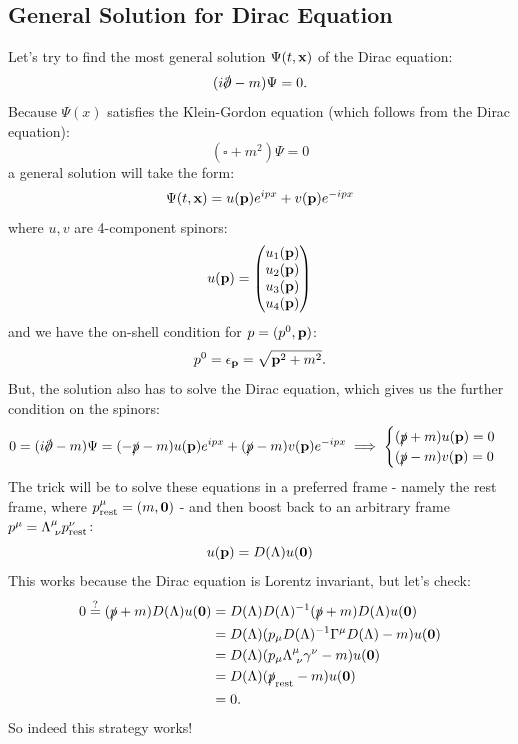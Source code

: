 \subsection{General Solution for Dirac Equation}
Let's try to find the most general solution $\Psi(t, \mathbf{x})$ of the Dirac equation:
\begin{equation}
    (i\slashed{\p} - m)\Psi = 0.
\end{equation}
Because $\Psi(x)$ satisfies the Klein-Gordon equation (which follows from the Dirac equation):
\begin{equation}
    (\square + m^2)\Psi = 0
\end{equation}
a general solution will take the form:
\begin{equation}
    \Psi(t, \mathbf{x}) = u(\mathbf{p})e^{ipx} + v(\mathbf{p})e^{-ipx}
\end{equation}
where $u, v$ are 4-component spinors:
\begin{equation}
    u(\mathbf{p}) = \begin{pmatrix}u_1(\mathbf{p}) \\ u_2(\mathbf{p}) \\ u_3(\mathbf{p}) \\ u_4(\mathbf{p})\end{pmatrix}
\end{equation}
and we have the on-shell condition for $p = (p^0, \mathbf{p})$:
\begin{equation}
    p^0 = \epsilon_{\mathbf{p}} = \sqrt{\mathbf{p}^2 + m^2}.
\end{equation}
But, the solution also has to solve the Dirac equation, which gives us the further condition on the spinors:
\begin{equation}
    0 = (i\slashed{\p} - m)\Psi = (-\slashed{p} - m)u(\v{p})e^{ipx} + (\slashed{p} - m)v(\v{p})e^{-ipx} \implies \begin{cases}
        (\slashed{p} + m)u(\v{p}) = 0
        \\ (\slashed{p} - m)v(\v{p}) = 0
    \end{cases}
\end{equation}
The trick will be to solve these equations in a preferred frame - namely the rest frame, where $ p^\mu_{\text{rest}} = (m, \mathbf{0})$ -  and then boost back to an arbitrary frame $p^\mu = \Lambda^{\mu}_{\sp\nu}p^\nu_{\text{rest}}$:
\begin{equation}
    u(\mathbf{p}) = D(\Lambda)u(\mathbf{0})
\end{equation}
This works because the Dirac equation is Lorentz invariant, but let's check:
\begin{equation}
    \begin{split}
        0 \stackrel{?}{=} (\slashed{p} + m)D(\Lambda)u(\v{0}) &= D(\Lambda)D(\Lambda)^{-1}(\slashed{p} + m)D(\Lambda)u(\v{0}) 
        \\ &= D(\Lambda)(p_\mu D(\Lambda)^{-1}\Gamma^\mu D(\Lambda) - m)u(\v{0})
        \\ &= D(\Lambda)(p_\mu \Lambda^{\mu}_{\sp\nu}\gamma^\nu - m)u(\v{0})
        \\ &= D(\Lambda)(\slashed{p}_{\text{rest}} - m)u(\v{0})
        \\ &= 0.
    \end{split}
\end{equation}
So indeed this strategy works!

